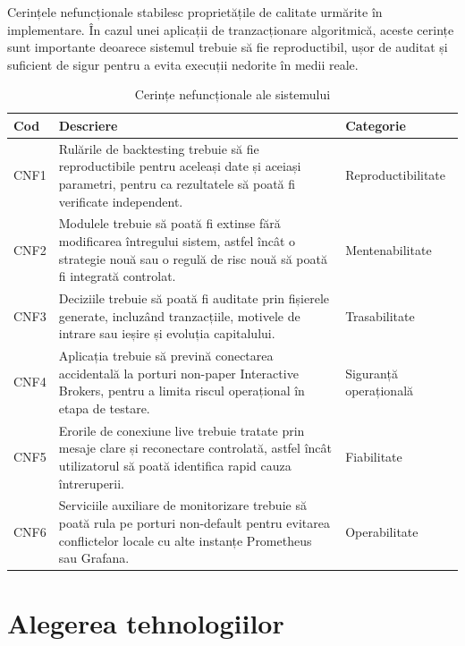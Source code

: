 Cerințele nefuncționale stabilesc proprietățile de calitate urmărite în implementare. În cazul unei aplicații de tranzacționare algoritmică, aceste cerințe sunt importante deoarece sistemul trebuie să fie reproductibil, ușor de auditat și suficient de sigur pentru a evita execuții nedorite în medii reale.

\begin{longtable}{|p{2cm}|p{9.2cm}|p{3cm}|}
    \caption{Cerințe nefuncționale ale sistemului}
    \label{tabel:cerinte_nefunctionale}\\
        \hline
        \textbf{Cod} & \textbf{Descriere} & \textbf{Categorie} \\
        \hline
        CNF1 & Rulările de backtesting trebuie să fie reproductibile pentru aceleași date și aceiași parametri, pentru ca rezultatele să poată fi verificate independent. & Reproductibilitate \\
        \hline
        CNF2 & Modulele trebuie să poată fi extinse fără modificarea întregului sistem, astfel încât o strategie nouă sau o regulă de risc nouă să poată fi integrată controlat. & Mentenabilitate \\
        \hline
        CNF3 & Deciziile trebuie să poată fi auditate prin fișierele generate, incluzând tranzacțiile, motivele de intrare sau ieșire și evoluția capitalului. & Trasabilitate \\
        \hline
        CNF4 & Aplicația trebuie să prevină conectarea accidentală la porturi non-paper Interactive Brokers, pentru a limita riscul operațional în etapa de testare. & Siguranță operațională \\
        \hline
        CNF5 & Erorile de conexiune live trebuie tratate prin mesaje clare și reconectare controlată, astfel încât utilizatorul să poată identifica rapid cauza întreruperii. & Fiabilitate \\
        \hline
        CNF6 & Serviciile auxiliare de monitorizare trebuie să poată rula pe porturi non-default pentru evitarea conflictelor locale cu alte instanțe Prometheus sau Grafana. & Operabilitate \\
        \hline
\end{longtable}

\section{Alegerea tehnologiilor}
\label{cap:cap3:tehnologii}

